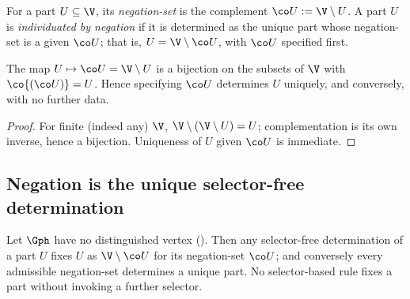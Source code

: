 \begin{definition}
\label{def:negationset}
For a part $U\subseteq\V$, its \emph{negation-set} is the complement
$\co U:=\V\setminus U$. A part $U$ is \emph{individuated by negation} if it is
determined as the unique part whose negation-set is a given $\co U$; that is,
$U=\V\setminus\co U$, with $\co U$ specified first.
\end{definition}

\begin{lemma}
\label{lem:involution}
The map $U\mapsto\co U=\V\setminus U$ is a bijection on the subsets of $\V$ with
$\co{(\co U)}=U$. Hence specifying $\co U$ determines $U$ uniquely, and
conversely, with no further data.
\end{lemma}

\begin{proof}
For finite (indeed any) $\V$, $\V\setminus(\V\setminus U)=U$; complementation is
its own inverse, hence a bijection. Uniqueness of $U$ given $\co U$ is immediate.
\end{proof}

\subsection{Negation is the unique selector-free determination}

\begin{theorem}
\label{thm:negation}
Let $\Gph$ have no distinguished vertex \textup{(}\textup{)}.
Then any selector-free determination of a part $U$ fixes $U$ as
$\V\setminus\co U$ for its negation-set $\co U$; and conversely every admissible
negation-set determines a unique part. No selector-based rule fixes a part
without invoking a further selector.
\end{theorem}

